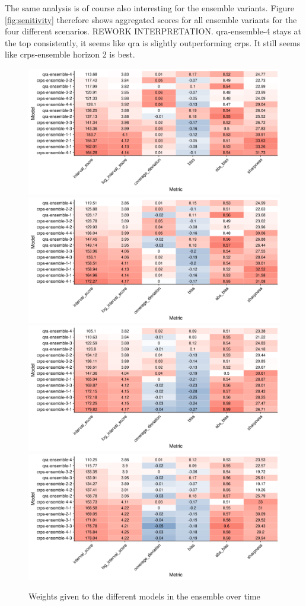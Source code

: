 \documentclass[
]{book}
\begin{document}
The same analysis is of course also interesting for the ensemble variants. Figure \ref{fig:senitivity} therefore shows aggregated scores for all ensemble variants for the four different scenarios. REWORK INTERPRETATION. qra-ensemble-4 stays at the top consistently, it seems like qra is slightly outperforming crps. It still seems like crps-ensemble horizon 2 is best.

\begin{figure}
\includegraphics[width=0.5\linewidth]{../visualisation/chapter-5-results/ensembles/scenario-baseline/coloured-summarised-scores} \includegraphics[width=0.5\linewidth]{../visualisation/chapter-5-results/ensembles/scenario-1/coloured-summarised-scores} \includegraphics[width=0.5\linewidth]{../visualisation/chapter-5-results/ensembles/scenario-2/coloured-summarised-scores} \includegraphics[width=0.5\linewidth]{../visualisation/chapter-5-results/ensembles/scenario-3/coloured-summarised-scores} \caption{Weights given to the different models in the ensemble over time}\label{fig:senitivity-ensembles}
\end{figure}
\end{document}

